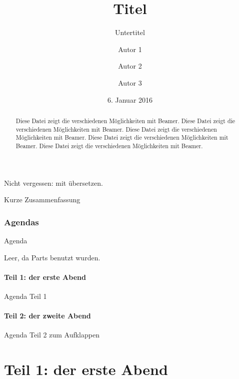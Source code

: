 \documentclass[t, aspectratio=169, ngerman]{beamer}
\title{Titel}
\subtitle{Untertitel}
\author{Autor 1 \and Autor 2 \and Autor 3}
\date{6. Januar 2016}
\begin{document}




	\frame{\titlepage}

	\begin{frame}
		Nicht vergessen: mit  übersetzen.
	\end{frame}

	\begin{frame}{Kurze Zusammenfassung}
		\begin{abstract}
			Diese Datei zeigt die verschiedenen Möglichkeiten mit Beamer.
			Diese Datei zeigt die verschiedenen Möglichkeiten mit Beamer.
			Diese Datei zeigt die verschiedenen Möglichkeiten mit Beamer.
			Diese Datei zeigt die verschiedenen Möglichkeiten mit Beamer.
			Diese Datei zeigt die verschiedenen Möglichkeiten mit Beamer.
		\end{abstract}
	\end{frame}

	\section*{Agendas}

	\begin{frame}{Agenda}
		\tableofcontents

		Leer, da Parts benutzt wurden.
	\end{frame}

	\subsection*{Teil 1: der erste Abend}

	\begin{frame}{Agenda Teil 1}
		\tableofcontents[part=1, subsectionstyle=hide]
	\end{frame}

	\subsection*{Teil 2: der zweite Abend}

	\begin{frame}{Agenda Teil 2 zum Aufklappen}
		\tableofcontents[part=2, pausesections]
	\end{frame}





	\part{Teil 1: der erste Abend}
\end{document}
